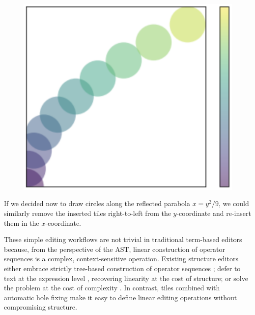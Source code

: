 \setlength\intextsep{0pt}
\begin{figure}
  \centering
  \hspace*{-0.07\columnwidth}
  \includegraphics[width=0.15\columnwidth]{img/circles-parabola-transpose.png}
\end{figure}

If we decided now to draw circles along the reflected
parabola $x = y^2/9$, we could similarly remove the inserted
tiles right-to-left from the $y$-coordinate and re-insert
them in the $x$-coordinate.


These simple editing workflows are not trivial
in traditional term-based editors because,
from the perspective of the AST, linear construction of
operator sequences is a complex, context-sensitive operation.
Existing structure editors either embrace strictly tree-based
construction of operator sequences \cite{scratch};
defer to text at the expression level \cite{Cornell,greenfoot},
recovering linearity at the cost of structure;
or solve the problem at the cost of complexity
\cite{GrammarCells}.
In contrast, tiles combined with automatic hole fixing
make it easy to define linear editing operations
without compromising structure.








